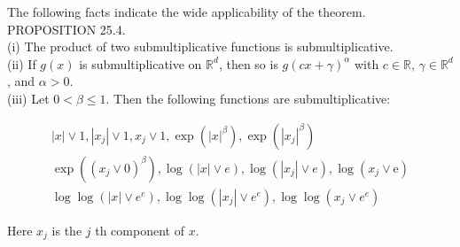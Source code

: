 \documentclass[a4paper,11pt]{article}
\begin{document}
The following facts indicate the wide applicability of the theorem. \\



PROPOSITION 25.4. \\
(i) The product of two submultiplicative functions is submultiplicative. \\
(ii) If $g(x)$ is submultiplicative on $\mathbb{R}^{d}$, then so is $g(c x+\gamma)^{\alpha}$
with $c \in \mathbb{R}$, $\gamma \in \mathbb{R}^{d}$, and $\alpha>0$. \\
(iii) Let $0<\beta \leq 1$. Then the following functions are submultiplicative:

$$
    \begin{gathered}
        |x| \vee 1,\left|x_{j}\right| \vee 1, x_{j} \vee 1, \exp \left(|x|^{\beta}\right), \exp \left(\left|x_{j}\right|^{\beta}\right) \\
        \exp \left(\left(x_{j} \vee 0\right)^{\beta}\right), \log (|x| \vee e), \log \left(\left|x_{j}\right| \vee e\right), \log \left(x_{j} \vee \mathrm{e}\right) \\
        \log \log \left(|x| \vee e^{e}\right), \log \log \left(\left|x_{j}\right| \vee e^{e}\right), \log \log \left(x_{j} \vee e^{e}\right)
    \end{gathered}
$$

Here $x_{j}$ is the $j$ th component of $x$.
\end{document}
